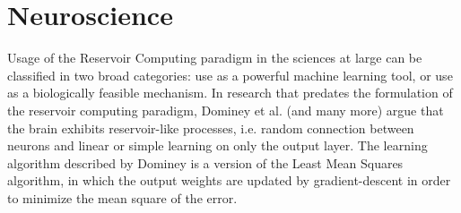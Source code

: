 \documentclass[12pt,oneside]{CUNY_CS_PhD}
\begin{document}
\section{Neuroscience}

Usage of the Reservoir Computing paradigm in the sciences at large can be classified in two broad categories: use as a powerful machine learning tool, or use as a biologically feasible mechanism. In research that predates the formulation of the reservoir computing paradigm, Dominey  et al. \cite{Dominey95, dominey1995complex} (and many more) argue that the brain exhibits reservoir-like processes, i.e. random connection between neurons and linear or simple learning on only the output layer. The learning algorithm described by Dominey is a version of the Least Mean Squares algorithm, in which the output weights are updated by gradient-descent in order to minimize the mean square of the error.\\
\end{document}
